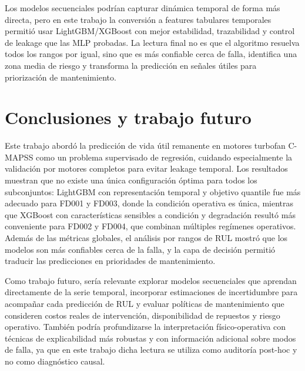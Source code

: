 \documentclass[conference, a4paper]{IEEEtran}
\begin{document}
Los modelos secuenciales podrían capturar dinámica temporal de forma más directa, pero en este trabajo la conversión a features tabulares temporales permitió usar LightGBM/XGBoost con mejor estabilidad, trazabilidad y control de leakage que las MLP probadas. La lectura final no es que el algoritmo resuelva todos los rangos por igual, sino que es más confiable cerca de falla, identifica una zona media de riesgo y transforma la predicción en señales útiles para priorización de mantenimiento.

\section{Conclusiones y trabajo futuro}

Este trabajo abordó la predicción de vida útil remanente en motores turbofan C-MAPSS como un problema supervisado de regresión, cuidando especialmente la validación por motores completos para evitar leakage temporal. Los resultados muestran que no existe una única configuración óptima para todos los subconjuntos: LightGBM con representación temporal y objetivo quantile fue más adecuado para FD001 y FD003, donde la condición operativa es única, mientras que XGBoost con características sensibles a condición y degradación resultó más conveniente para FD002 y FD004, que combinan múltiples regímenes operativos. Además de las métricas globales, el análisis por rangos de RUL mostró que los modelos son más confiables cerca de la falla, y la capa de decisión permitió traducir las predicciones en prioridades de mantenimiento.

Como trabajo futuro, sería relevante explorar modelos secuenciales que aprendan directamente de la serie temporal, incorporar estimaciones de incertidumbre para acompañar cada predicción de RUL y evaluar políticas de mantenimiento que consideren costos reales de intervención, disponibilidad de repuestos y riesgo operativo. También podría profundizarse la interpretación físico-operativa con técnicas de explicabilidad más robustas y con información adicional sobre modos de falla, ya que en este trabajo dicha lectura se utiliza como auditoría post-hoc y no como diagnóstico causal.



\end{document}
